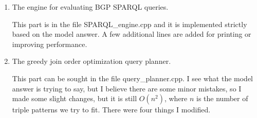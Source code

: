 \documentclass{article}
\begin{document}
\begin{enumerate}
\begin{enumerate}
3) To match the patterns like $\langle X, Y, Z\rangle$, the paper suggests to iterate over the triple table; if we want $X = Y$,  we skip those $X\neq Y$. I modify this a little bit to improve the efficiency. Again, $\langle X, X, Z\rangle$, for example, we first iterate $I_s$, and for each $s$ in $I_s$, we find if $I_{sp}$ includes hash($s, s$), if yes, we traverse over the triple table. As shown in the pseudo-code in Algorithm \eqref{alg:evaluateXXP}\footnote{The actual implementation is slightly different. I put the check of if $i$ in $I_{sp}$ at the beginning of the Evaluate\_SPZ to reduce some code redundancy, but they are equivalent.}.

\begin{algorithm}[H]
\caption{Evaluate $\langle X, X, Z\rangle$}\label{alg:evaluateXXP}
\begin{algorithmic}
\State $i = $ hash($s, s$)
\State Evaluate\_SPZ($s, s$)
\EndIf
\EndFor
\end{algorithmic}
\end{algorithm}

$\langle X, Y, Y\rangle$ and $\langle X, Y, X\rangle$ are similar. For $\langle X, X, X\rangle$, we only need to traverse  $s$ in $I_s$ and find if $\langle s, s, s\rangle$ is in $I_{spo}$ as shown in  Algorithm \eqref{alg:evaluateXXX}.

\begin{algorithm}[H]
\caption{Evaluate $\langle X, X, X\rangle$}\label{alg:evaluateXXX}
\begin{algorithmic}
\State Evaluate\_SPO($s, s, s$) 
\EndFor
\end{algorithmic}
\end{algorithm}

\item The engine for evaluating BGP SPARQL queries.

This part is in the file SPARQL\_engine.cpp and it is implemented strictly based on the model answer. A few additional lines are added for printing or improving performance.

\item The greedy join order optimization query planner.

This part can be sought in the file query\_planner.cpp. I see what the model answer is trying to say, but I believe there are some minor mistakes, so I made some slight changes, but it is still $O(n^2)$, where $n$ is the number of triple patterns we try to fit. There were four things I modified. 


\end{enumerate}
\end{enumerate}
\end{document}
